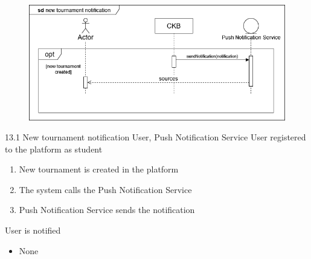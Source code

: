 \usecase
{
    \begin{figure}[H]
        \centering
        \includegraphics[width=\textwidth]{src/sd_diagrams/pushtourn.png}
    \end{figure}
}
{13.1}
{New tournament notification} %
{User, Push Notification Service} %
{User registered to the platform as student} %
{ %
    \begin{enumerate}
        \item New tournament is created in the platform
        \item The system calls the Push Notification Service
        \item Push Notification Service sends the notification
    \end{enumerate}
}
{User is notified} %
{ %
    \begin{itemize}
        \item None
    \end{itemize}
}
{ %

}

